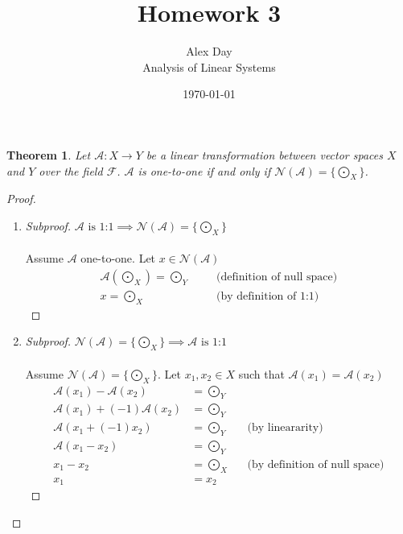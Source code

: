 \documentclass[12pt,fleqn,leqno,letterpaper]{article}
\title{Homework 3}
\author{Alex Day\\
	\small{Analysis of Linear Systems}
}
\date{\today}
\newtheorem{theorem}{Theorem}
\newenvironment{subproof}[1][\proofname]{%
  \renewcommand{\qedsymbol}{$\blacksquare$}%
  \begin{proof}[#1]%
}{%
  \end{proof}%
}
\begin{document}
	\maketitle
	\begin{theorem}
		Let $\mathcal{A} \colon X \to Y$ be a linear transformation between vector spaces $X$ and $Y$ over the field $\mathcal{F}$. $\mathcal{A}$ is one-to-one if and only if $\mathcal{N}(\mathcal{A}) = \{\bigodot_{X}\}$.
	\end{theorem}
	\begin{proof}
		\item
		\begin{enumerate}
			\item
			\begin{subproof}[Subproof] $\mathcal{A}\text{ is 1:1} \implies \mathcal{N}(\mathcal{A}) = \{\bigodot_{X}\}$\\\\
				Assume $\mathcal{A}$ one-to-one. Let $x \in \mathcal{N}(\mathcal{A})$
				\begin{align*}
					\mathcal{A}(\bigodot_{X}) = \bigodot_{Y} & && \text{(definition of null space)}\\
					x = \bigodot_{X} & && \text{(by definition of 1:1)}
				\end{align*}
			\end{subproof}
			\item
				\begin{subproof}[Subproof] $\mathcal{N}(\mathcal{A}) = \{\bigodot_{X}\} \implies \mathcal{A}\text{ is 1:1}$\\\\
				Assume $\mathcal{N}(\mathcal{A}) = \{\bigodot_{X}\}$.
				Let $x_{1}, x_{2} \in X$ such that $\mathcal{A}(x_{1}) = \mathcal{A}(x_{2})$
				\begin{align*}
					\mathcal{A}(x_{1}) - \mathcal{A}(x_{2}) &= \bigodot_{Y}\\
					\mathcal{A}(x_{1}) + (-1) \mathcal{A}(x_{2}) &= \bigodot_{Y}\\
					\mathcal{A}(x_{1} + (-1) x_{2}) &= \bigodot_{Y} && \text{(by lineararity)}\\
					\mathcal{A}(x_{1} - x_{2}) &= \bigodot_{Y}\\
					x_{1} - x_{2} &= \bigodot_{X} && \text{(by definition of null space)}\\
					x_{1} &= x_{2}
				\end{align*}
			\end{subproof}
		\end{enumerate}
	\end{proof}
\end{document}

